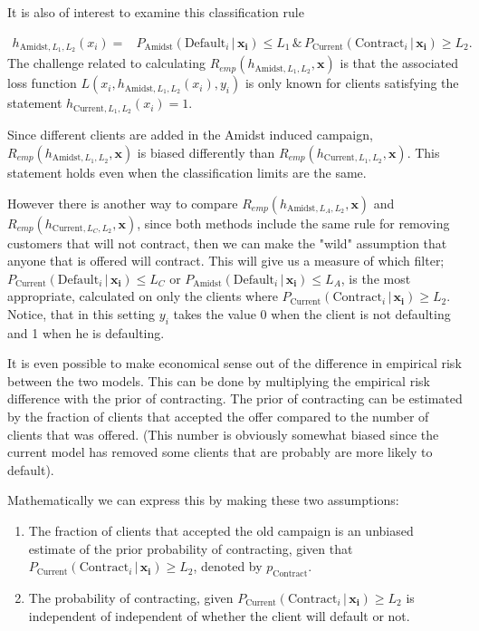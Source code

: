 \documentclass{article}
\theoremstyle{theorem}
\theoremstyle{definition}
\newcommand{\bv}[1]{\bm{#1}}
\begin{document}
It is also of interest to examine this classification rule

\begin{equation}
\begin{split}
\label{eq:amidst}
h_{\mbox{Amidst},L_1,L_2}(x_i) = &
P_{\mbox{Amidst}}(\mbox{Default}_i \,|\, \bv{x_i}) \leq L_1
 \, \& \,
P_{\mbox{Current}}(\mbox{Contract}_i \,|\, \bv{x_i}) \geq L_2.
\end{split}
\end{equation}
The challenge related to calculating $R_{emp}(h_{\mbox{Amidst},L_1,L_2}, \bv{x})$ is that the associated loss function 
$L(x_i, h_{\mbox{Amidst},L_1,L_2}(x_i) , y_i)$ is only known for clients satisfying the statement $h_{\mbox{Current},L_1,L_2}(x_i) = 1$.  

Since different clients are added in the Amidst induced campaign, $R_{emp}(h_{\mbox{Amidst},L_1,L_2}, \bv{x})$ is biased differently than $R_{emp}(h_{\mbox{Current},L_1,L_2}, \bv{x})$. This statement holds even when the classification limits are the same. 

However there is another way to compare $R_{emp}(h_{\mbox{Amidst},L_A,L_2}, \bv{x})$ and $R_{emp}(h_{\mbox{Current},L_C,L_2}, \bv{x})$, since both methods include the same rule for removing customers that will not contract, then we can make the "wild" assumption that anyone that is offered will contract.  This will give us a measure of which filter; $P_{\mbox{Current}}(\mbox{Default}_i \,|\, \bv{x_i}) \leq L_C$ or $P_{\mbox{Amidst}}(\mbox{Default}_i \,|\, \bv{x_i}) \leq L_A$, is the most appropriate, calculated on only the clients where $P_{\mbox{Current}}(\mbox{Contract}_i \,|\, \bv{x_i}) \geq L_2$.  Notice, that in this setting $y_i$ takes the value 0 when the client is not defaulting and 1 when he is defaulting.

It is even possible to make economical sense out of the difference in empirical risk between the two models.  This can be done by multiplying the empirical risk difference with the prior of contracting.  The prior of contracting can be estimated by the fraction of clients that accepted the offer compared to the number of clients that was offered.  (This number is obviously somewhat biased since the current model has removed some clients that are probably are more likely to default).

Mathematically we can express this by making these two assumptions:

\begin{enumerate}
\item The fraction of clients that accepted the old campaign is an unbiased estimate of the prior probability of contracting, given that $P_{\mbox{Current}}(\mbox{Contract}_i \,|\, \bv{x_i}) \geq L_2$, denoted by $p_{\mbox{Contract} }$.
\item The probability of contracting, given $P_{\mbox{Current}}(\mbox{Contract}_i \,|\, \bv{x_i}) \geq L_2$ is independent of independent of whether the client will default or not.
\end{enumerate}
\end{document}
